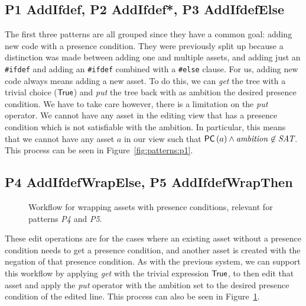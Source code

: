 \subsection*{P1 AddIfdef, P2 AddIfdef*, P3 AddIfdefElse}
The first three patterns are all grouped since they have a common goal:
adding new code with a presence condition. They were previously split up because
a distinction was made between adding one and multiple assets, and adding just an
\texttt{\#ifdef} and adding an \texttt{\#ifdef} combined with a \texttt{\#else} clause.
For us, adding new code always means adding a new asset. To do this, we can \emph{get}
the tree with a trivial choice (\({\sf True}\)) and \emph{put} the tree back with as
ambition the desired presence condition. We have to take care however, there is a limitation
on the \emph{put} operator. We cannot have any asset in the editing view that
has a presence condition which is not satisfiable with the ambition. In
particular, this means that we cannot have any asset $a$ in our view such that
\({\sf PC}\left(a\right) \land \mathit{ambition} \not\in \textit{SAT}\).
This process can be seen in Figure~\ref{fig:patterns:p1}.

\subsection*{P4 AddIfdefWrapElse, P5 AddIfdefWrapThen}
\begin{figure}
  \centering
  \caption{Workflow for wrapping assets with presence conditions, relevant for patterns \emph{P4} and \emph{P5}.}
  \label{fig:patterns:p4}
\end{figure}
These edit operations are for the cases where an existing asset without a
presence condition needs to get a presence condition, and another asset is
created with the negation of that presence condition. As with the previous
system, we can support this workflow by applying \emph{get} with the trivial
expression \({\sf True}\), to then edit that asset and apply the \emph{put}
operator with the ambition set to the desired presence condition of the
edited line. This process can also be seen in Figure~\ref{fig:patterns:p4}.


